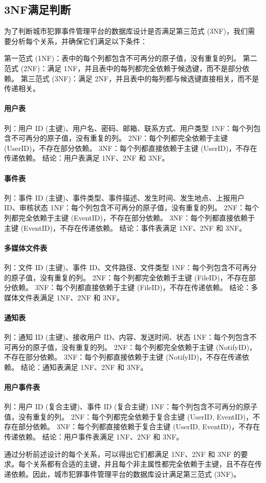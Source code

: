 \subsection{3NF满足判断}

为了判断城市犯罪事件管理平台的数据库设计是否满足第三范式 (3NF)，我们需要分析每个关系，并确保它们满足以下条件：

第一范式 (1NF)：表中的每个列都包含不可再分的原子值，没有重复的列。
第二范式 (2NF)：满足 1NF，并且表中的每列都完全依赖于候选键，而不是部分依赖。
第三范式 (3NF)：满足 2NF，并且表中的每列都与候选键直接相关，而不是传递相关。

\paragraph{用户表}
列：用户 ID (主键)、用户名、密码、邮箱、联系方式、用户类型
1NF：每个列包含不可再分的原子值，没有重复的列。
2NF：每个列都完全依赖于主键 (UserID)，不存在部分依赖。
3NF：每个列都直接依赖于主键 (UserID)，不存在传递依赖。
结论：用户表满足 1NF、2NF 和 3NF。

\paragraph{事件表}
列：事件 ID (主键)、事件类型、事件描述、发生时间、发生地点、上报用户 ID、审核状态
1NF：每个列包含不可再分的原子值，没有重复的列。
2NF：每个列都完全依赖于主键 (EventID)，不存在部分依赖。
3NF：每个列都直接依赖于主键 (EventID)，不存在传递依赖。
结论：事件表满足 1NF、2NF 和 3NF。

\paragraph{多媒体文件表}
列：文件 ID (主键)、事件 ID、文件路径、文件类型
1NF：每个列包含不可再分的原子值，没有重复的列。
2NF：每个列都完全依赖于主键 (FileID)，不存在部分依赖。
3NF：每个列都直接依赖于主键 (FileID)，不存在传递依赖。
结论：多媒体文件表满足 1NF、2NF 和 3NF。

\paragraph{通知表}
列：通知 ID (主键)、接收用户 ID、内容、发送时间、状态
1NF：每个列包含不可再分的原子值，没有重复的列。
2NF：每个列都完全依赖于主键 (NotifyID)，不存在部分依赖。
3NF：每个列都直接依赖于主键 (NotifyID)，不存在传递依赖。
结论：通知表满足 1NF、2NF 和 3NF。

\paragraph{用户事件表}
列：用户 ID (复合主键)、事件 ID (复合主键)
1NF：每个列包含不可再分的原子值，没有重复的列。
2NF：每个列都完全依赖于复合主键 (UserID, EventID)，不存在部分依赖。
3NF：每个列都直接依赖于复合主键 (UserID, EventID)，不存在传递依赖。
结论：用户事件表满足 1NF、2NF 和 3NF。

通过分析前述设计的每个关系，可以得出它们都满足 1NF、2NF 和 3NF 的要求。每个关系都有合适的主键，并且每个非主属性都完全依赖于主键，且不存在传递依赖。因此，城市犯罪事件管理平台的数据库设计满足第三范式 (3NF)。
